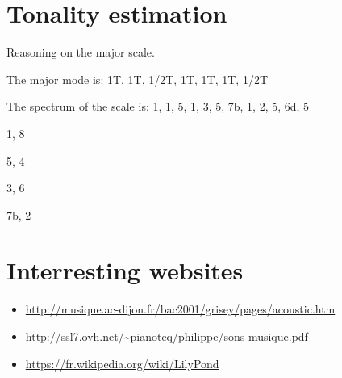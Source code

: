 \documentclass{article}
\begin{document}
\section{Tonality estimation}

Reasoning on the major scale.

The major mode is:  1T, 1T, 1/2T, 1T, 1T, 1T, 1/2T

The spectrum of the scale is:
1, 1, 5, 1, 3, 5, 7b, 1, 2, 5, 6d, 5

1, 8

5, 4

3, 6

7b, 2

\section{Interresting websites}

\begin{itemize}
\item \url{http://musique.ac-dijon.fr/bac2001/grisey/pages/acoustic.htm}
\item \url{http://ssl7.ovh.net/~pianoteq/philippe/sons-musique.pdf}
\item \url{https://fr.wikipedia.org/wiki/LilyPond}
\end{itemize}
\end{document}
